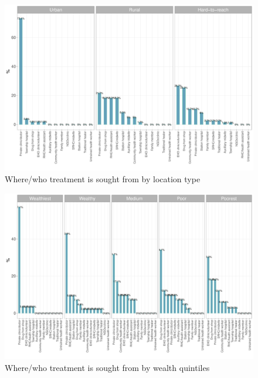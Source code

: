 \documentclass[12pt,a4paper]{article}
\begin{document}
\begin{figure}[H]

{\centering \includegraphics{kayinReport_files/figure-latex/ari5plot-1} 

}

\caption{Where/who treatment is sought from by location type}\label{fig:ari5plot}
\end{figure}

\begin{figure}[H]

{\centering \includegraphics{kayinReport_files/figure-latex/ari6plot-1} 

}

\caption{Where/who treatment is sought from by wealth quintiles}\label{fig:ari6plot}
\end{figure}
\end{document}
